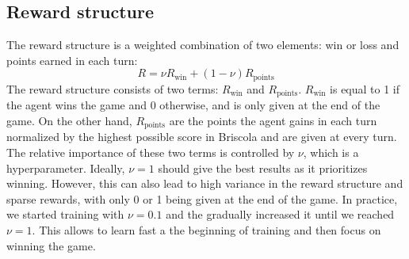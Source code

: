 \subsection{Reward structure}
The reward structure is a weighted combination of two elements: win or loss and points earned in each turn:
\begin{equation}
    R = \nu R_\textrm{win} + (1 - \nu) R_\textrm{points}
    \label{eq:reward-structure}
\end{equation}
The reward structure consists of two terms: $R_\textrm{win}$ and $R_\textrm{points}$. $R_\textrm{win}$ is equal to 1 if the agent wins the game and 0 otherwise, and is only given at the end of the game. On the other hand, $R_\textrm{points}$ are the points the agent gains in each turn normalized by the highest possible score in Briscola and are given at every turn. The relative importance of these two terms is controlled by $\nu$, which is a hyperparameter. Ideally, $\nu=1$ should give the best results as it prioritizes winning. However, this can also lead to high variance in the reward structure and sparse rewards, with only 0 or 1 being given at the end of the game. In practice, we started training with $\nu=0.1$ and the gradually increased it until we reached $\nu=1$. This allows to learn fast a the beginning of training and then focus on winning the game.

